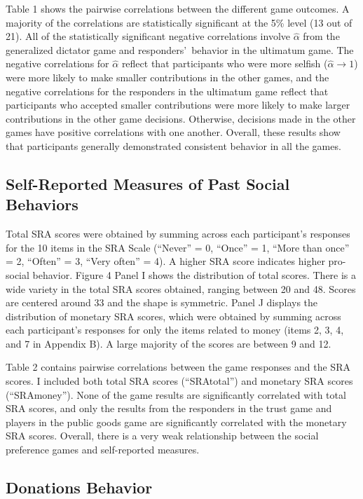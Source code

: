 \documentclass[12pt]{article}
\begin{document}
Table 1 shows the pairwise correlations between the different game outcomes. A majority of the correlations are statistically significant at the 5\% level (13 out of 21). All of the statistically significant negative correlations involve \(\hat{\alpha}\) from the generalized dictator game and responders\rq \ behavior in the ultimatum game. The negative correlations for \(\hat{\alpha}\) reflect that participants who were more selfish (\(\hat{\alpha} \rightarrow 1\)) were more likely to make smaller contributions in the other games, and the negative correlations for the responders in the ultimatum game reflect that participants who accepted smaller contributions were more likely to make larger contributions in the other game decisions. Otherwise, decisions made in the other games have positive correlations with one another. Overall, these results show that participants generally demonstrated consistent behavior in all the games.

\subsection{Self-Reported Measures of Past Social Behaviors}

Total SRA scores were obtained by summing across each participant\rq s responses for the 10 items in the SRA Scale (``Never'' = 0, ``Once'' = 1, ``More than once'' = 2, ``Often'' = 3, ``Very often'' = 4). A higher SRA score indicates higher pro-social behavior. Figure 4 Panel I shows the distribution of total scores. There is a wide variety in the total SRA scores obtained, ranging between 20 and 48. Scores are centered around 33 and the shape is symmetric. Panel J displays the distribution of monetary SRA scores, which were obtained by summing across each participant\rq s responses for only the items related to money (items 2, 3, 4, and 7 in Appendix B).  A large majority of the scores are between 9 and 12.

Table 2 contains pairwise correlations between the game responses and the SRA scores. I included both total SRA scores (``SRAtotal'') and monetary SRA scores (``SRAmoney''). None of the game results are significantly correlated with total SRA scores, and only the results from the responders in the trust game and players in the public goods game are significantly correlated with the monetary SRA scores. Overall, there is a very weak relationship between the social preference games and self-reported measures. 

\subsection{Donations Behavior}
\end{document}
